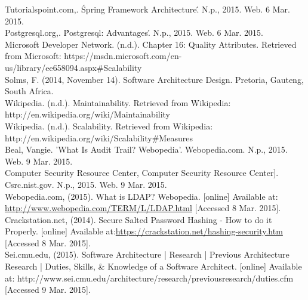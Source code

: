 Tutorialspoint.com,. \'Spring Framework Architecture\'. N.p., 2015. Web. 6 Mar. 2015. \\

Postgresql.org,. \'Postgresql: Advantages\'. N.p., 2015. Web. 6 Mar. 2015.\\

Microsoft Developer Network. (n.d.). Chapter 16: Quality Attributes. Retrieved from Microsoft: https://msdn.microsoft.com/en-us/library/ee658094.aspx#Scalability\\

Solms, F. (2014, November 14). Software Architecture Design. Pretoria, Gauteng, South Africa.\\

Wikipedia. (n.d.). Maintainability. Retrieved from Wikipedia: http://en.wikipedia.org/wiki/Maintainability\\

Wikipedia. (n.d.). Scalability. Retrieved from Wikipedia: http://en.wikipedia.org/wiki/Scalability#Measures\\

Beal, Vangie. 'What Is Audit Trail? Webopedia'. Webopedia.com. N.p., 2015. Web. 9 Mar. 2015.\\

Computer Security Resource Center, Computer Security Resource Center]. Csrc.nist.gov. N.p., 2015. Web. 9 Mar. 2015.\\

Webopedia.com, (2015). What is LDAP? Webopedia. [online] Available at: \url{http://www.webopedia.com/TERM/L/LDAP.html} [Accessed 8 Mar. 2015].\\

Crackstation.net, (2014). Secure Salted Password Hashing - How to do it Properly. [online] Available at:\url{https://crackstation.net/hashing-security.htm} [Accessed 8 Mar. 2015].\\

Sei.cmu.edu, (2015). Software Architecture | Research | Previous Architecture Research | Duties, Skills, & Knowledge of a Software Architect. [online] Available at: http://www.sei.cmu.edu/architecture/research/previousresearch/duties.cfm [Accessed 9 Mar. 2015]. \\
